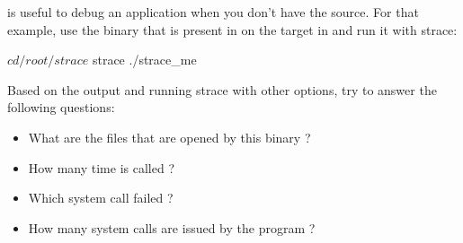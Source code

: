  is useful to debug an application when you don't have the source.
For that example, use the  binary that is present in on the
target in  and run it with strace:

\begin{bashinput}
$ cd /root/strace
$ strace ./strace_me
\end{bashinput}

Based on the output and running strace with other options, try to answer the
following questions:
\begin{itemize}
  \item What are the files that are opened by this binary ?
  \item How many time is  called ?
  \item Which  system call failed ?
  \item How many system calls are issued by the program ?
\end{itemize}